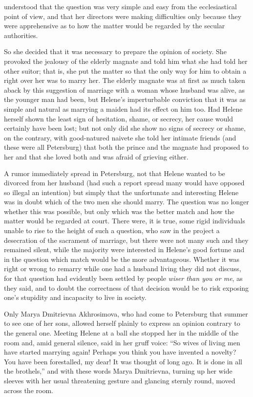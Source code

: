  understood that the question was very simple and easy from
the ecclesiastical point of view, and that her directors were
making difficulties only because they were apprehensive as to how
the matter would be regarded by the secular authorities.

So she decided that it was necessary to prepare the opinion of
society.  She provoked the jealousy of the elderly magnate and
told him what she had told her other suitor; that is, she put the
matter so that the only way for him to obtain a right over her
was to marry her. The elderly magnate was at first as much taken
aback by this suggestion of marriage with a woman whose husband
was alive, as the younger man had been, but Helene's
imperturbable conviction that it was as simple and natural as
marrying a maiden had its effect on him too. Had Helene herself
shown the least sign of hesitation, shame, or secrecy, her cause
would certainly have been lost; but not only did she show no
signs of secrecy or shame, on the contrary, with good-natured
naivete she told her intimate friends (and these were all
Petersburg) that both the prince and the magnate had proposed to
her and that she loved both and was afraid of grieving either.

A rumor immediately spread in Petersburg, not that Helene wanted
to be divorced from her husband (had such a report spread many
would have opposed so illegal an intention) but simply that the
unfortunate and interesting Helene was in doubt which of the two
men she should marry.  The question was no longer whether this
was possible, but only which was the better match and how the
matter would be regarded at court. There were, it is true, some
rigid individuals unable to rise to the height of such a
question, who saw in the project a desecration of the sacrament
of marriage, but there were not many such and they remained
silent, while the majority were interested in Helene's good
fortune and in the question which match would be the more
advantageous. Whether it was right or wrong to remarry while one
had a husband living they did not discuss, for that question had
evidently been settled by people \emph{wiser than you or me}, as
they said, and to doubt the correctness of that decision would be
to risk exposing one's stupidity and incapacity to live in
society.

Only Marya Dmitrievna Akhrosimova, who had come to Petersburg
that summer to see one of her sons, allowed herself plainly to
express an opinion contrary to the general one. Meeting Helene at
a ball she stopped her in the middle of the room and, amid
general silence, said in her gruff voice: ``So wives of living
men have started marrying again!  Perhaps you think you have
invented a novelty? You have been forestalled, my dear! It was
thought of long ago. It is done in all the brothels,'' and with
these words Marya Dmitrievna, turning up her wide sleeves with
her usual threatening gesture and glancing sternly round, moved
across the room.

